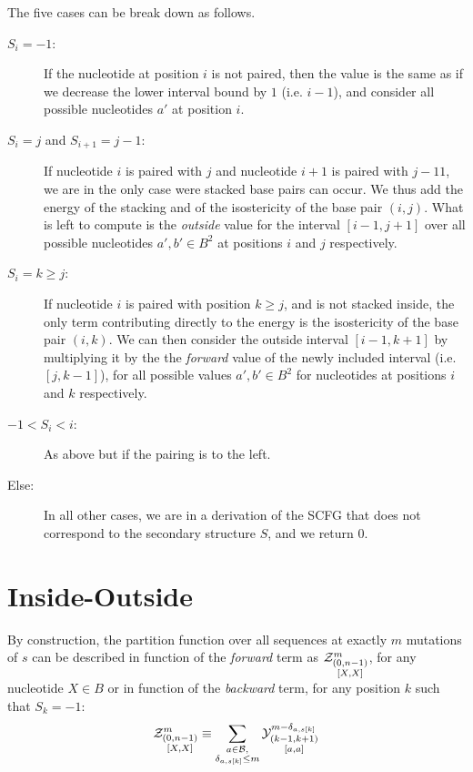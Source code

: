 The five cases can be break down as follows.
\begin{description}
\item[$S_i=-1$:] If the nucleotide at position $i$ is not paired, then the value is the same
as if we decrease the lower interval bound by $1$ (i.e. $i-1$), and consider all possible
nucleotides $a'$ at position $i$.
\item[$S_{i}=j$ and $S_{i+1}=j-1$:] If nucleotide $i$ is paired with $j$ and nucleotide $i+1$ is
paired with $j-11$, we are in the only case were stacked base pairs can occur. We thus add
the energy of the stacking and of the isostericity of the base pair $(i,j)$. What is left
to compute is the \emph{outside} value for the interval $[i-1,j+1]$ over all possible nucleotides 
$a',b'\in B^2$ at positions $i$ and $j$ respectively.
\item[$S_{i}=k \geq j$:]If nucleotide $i$ is paired with position $k\geq j$, 
and is not stacked inside, the 
only term contributing directly to the energy is the isostericity of the base pair $(i,k)$. 
We can then consider the outside interval $[i-1,k+1]$ by multiplying it by the the \emph{forward}
value of the newly included interval (i.e. $[j,k-1]$), for 
all possible values $a',b'\in B^2$ for nucleotides at positions $i$ and $k$ respectively.
\item[$-1<S_{i}<i$:]As above but if the pairing is to the left.
\item[Else:] In all other cases, we are in a derivation of the SCFG that does not correspond to the 
secondary structure $S$, and we return $0$.


\end{description}

\section{Inside-Outside}
By construction, the partition function over all sequences at exactly $m$ mutations of $s$ can 
be described in function of the \emph{forward} term as $\Z{0,n-1}{m}{X,X}$,
 for any nucleotide $X\in B$ or
in function of the \emph{backward} term, for any position $k$ such that $S_k=-1$:
$$
	\Z{0,n-1}{m}{X,X}
	\equiv
	\sum_{\substack{a\in \B,\\ \Kron_{a,s[k]}\le m}}	
	\Y{k-1,k+1}{m-\Kron_{a,s[k]}}{a,a}
$$

